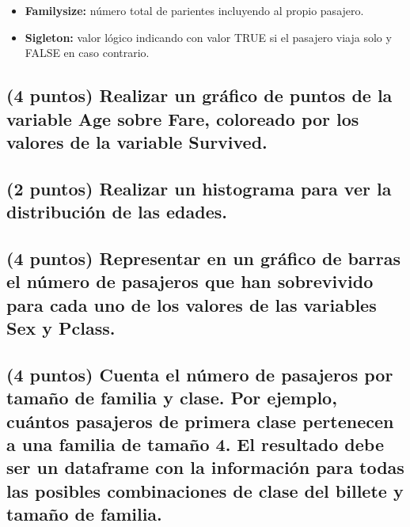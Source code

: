 \documentclass[]{article}
\providecommand{\tightlist}{%
  \setlength{\itemsep}{0pt}\setlength{\parskip}{0pt}}
\begin{document}
\begin{itemize}
\tightlist
\item
  \textbf{Familysize:} número total de parientes incluyendo al propio
  pasajero.
\item
  \textbf{Sigleton:} valor lógico indicando con valor TRUE si el
  pasajero viaja solo y FALSE en caso contrario.
\end{itemize}

\subsection{\texorpdfstring{(4 puntos) Realizar un gráfico de puntos de
la variable \textbf{Age} sobre \textbf{Fare}, coloreado por los valores
de la variable
\textbf{Survived}.}{(4 puntos) Realizar un gráfico de puntos de la variable Age sobre Fare, coloreado por los valores de la variable Survived.}}\label{puntos-realizar-un-grafico-de-puntos-de-la-variable-age-sobre-fare-coloreado-por-los-valores-de-la-variable-survived.}

\subsection{(2 puntos) Realizar un histograma para ver la distribución
de las
edades.}\label{puntos-realizar-un-histograma-para-ver-la-distribucion-de-las-edades.}

\subsection{\texorpdfstring{(4 puntos) Representar en un gráfico de
barras el número de pasajeros que han sobrevivido para cada uno de los
valores de las variables \textbf{Sex} y
\textbf{Pclass}.}{(4 puntos) Representar en un gráfico de barras el número de pasajeros que han sobrevivido para cada uno de los valores de las variables Sex y Pclass.}}\label{puntos-representar-en-un-grafico-de-barras-el-numero-de-pasajeros-que-han-sobrevivido-para-cada-uno-de-los-valores-de-las-variables-sex-y-pclass.}

\subsection{(4 puntos) Cuenta el número de pasajeros por tamaño de
familia y clase. Por ejemplo, cuántos pasajeros de primera clase
pertenecen a una familia de tamaño 4. El resultado debe ser un dataframe
con la información para todas las posibles combinaciones de clase del
billete y tamaño de
familia.}\label{puntos-cuenta-el-numero-de-pasajeros-por-tamano-de-familia-y-clase.-por-ejemplo-cuantos-pasajeros-de-primera-clase-pertenecen-a-una-familia-de-tamano-4.-el-resultado-debe-ser-un-dataframe-con-la-informacion-para-todas-las-posibles-combinaciones-de-clase-del-billete-y-tamano-de-familia.}
\end{document}
